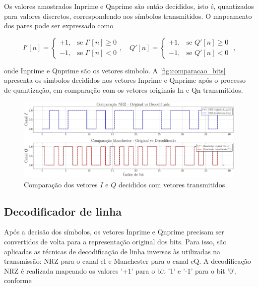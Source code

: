 Os valores amostrados \gls{Inprime} e \gls{Qnprime} são então decididos, isto é, quantizados para valores discretos, correspondendo aos símbolos transmitidos. O mapeamento dos pares pode ser expressado como

\begin{equation} 
    I'[n] = \begin{cases}
    +1, & \text{se } I'[n] \geq 0 \\
    -1, & \text{se } I'[n] < 0
    \end{cases}, \quad
    Q'[n] = \begin{cases}
    +1, & \text{se } Q'[n] \geq 0 \\
    -1, & \text{se } Q'[n] < 0
    \end{cases} \text{ ,}
\end{equation}

\noindent onde \gls{Inprime} e \gls{Qnprime} são os vetores simbolo. A \autoref{fig:comparacao_bits} apresenta os simbolos decididos nos vetores \gls{Inprime} e \gls{Qnprime} após o processo de quantização, em comparação com os vetores originais \gls{In} e \gls{Qn} transmitidos.

\begin{figure}[H]
	\centering
	\caption{Comparação dos vetores $I$ e $Q$ decididos com vetores transmitidos}\label{fig:comparacao_bits}
	\includegraphics[width=\linewidth]{assets/cap2/comparacao_bits.pdf}
\end{figure}

\subsection{Decodificador de linha}

Após a decisão dos símbolos, os vetores \gls{Inprime} e \gls{Qnprime} precisam ser convertidos de volta para a representação original dos bits. Para isso, são aplicadas as técnicas de decodificação de linha inversas às utilizadas na transmissão: \gls{NRZ} para o canal \gls{cI} e \gls{Manchester} para o canal \gls{cQ}. A decodificação \gls{NRZ} é realizada mapeando os valores '+1' para o bit '1' e '-1' para o bit '0', conforme

